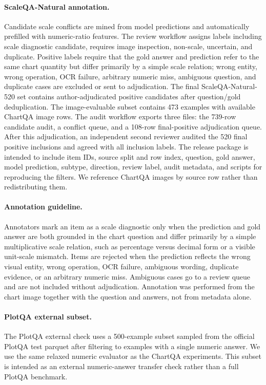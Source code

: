 \paragraph{ScaleQA-Natural annotation.}
Candidate scale conflicts are mined from model predictions and automatically prefilled with numeric-ratio features. The review workflow assigns labels including scale diagnostic candidate, requires image inspection, non-scale, uncertain, and duplicate. Positive labels require that the gold answer and prediction refer to the same chart quantity but differ primarily by a simple scale relation; wrong entity, wrong operation, OCR failure, arbitrary numeric miss, ambiguous question, and duplicate cases are excluded or sent to adjudication. The final ScaleQA-Natural-520 set contains author-adjudicated positive candidates after question/gold deduplication. The image-evaluable subset contains 473 examples with available ChartQA image rows. The audit workflow exports three files: the 739-row candidate audit, a conflict queue, and a 108-row final-positive adjudication queue. After this adjudication, an independent second reviewer audited the 520 final positive inclusions and agreed with all inclusion labels. The release package is intended to include item IDs, source split and row index, question, gold answer, model prediction, subtype, direction, review label, audit metadata, and scripts for reproducing the filters. We reference ChartQA images by source row rather than redistributing them.

\paragraph{Annotation guideline.}
\label{app:guideline}
Annotators mark an item as a scale diagnostic only when the prediction and gold answer are both grounded in the chart question and differ primarily by a simple multiplicative scale relation, such as percentage versus decimal form or a visible unit-scale mismatch. Items are rejected when the prediction reflects the wrong visual entity, wrong operation, OCR failure, ambiguous wording, duplicate evidence, or an arbitrary numeric miss. Ambiguous cases go to a review queue and are not included without adjudication. Annotation was performed from the chart image together with the question and answers, not from metadata alone.

\paragraph{PlotQA external subset.}
The PlotQA external check uses a 500-example subset sampled from the official PlotQA test parquet after filtering to examples with a single numeric answer. We use the same relaxed numeric evaluator as the ChartQA experiments. This subset is intended as an external numeric-answer transfer check rather than a full PlotQA benchmark.


